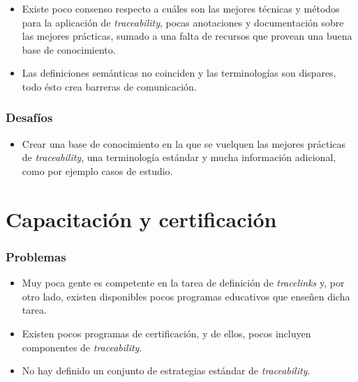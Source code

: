 \documentclass[a4paper,12pt,oneside,spanish]{book}
\begin{document}
\begin{itemize}[label={$\times$}]

\item Existe poco consenso respecto a cuáles son las mejores técnicas y métodos para la aplicación de \textit{traceability}, pocas anotaciones y documentación sobre las mejores prácticas, sumado a una falta de recursos que provean una buena base de conocimiento.

\item Las definiciones semánticas no coinciden y las terminologías son dispares, todo ésto crea barreras de comunicación.

\end{itemize}

\subsubsection{Desafíos}

\begin{itemize}[label={\checkmark}]

\item Crear una base de conocimiento en la que se vuelquen las mejores prácticas de \textit{traceability}, una terminología estándar y mucha información adicional, como por ejemplo casos de estudio.

\end{itemize}

\section{Capacitación y certificación}

\subsubsection{Problemas}

\begin{itemize}[label={$\times$}]
\item Muy poca gente es competente en la tarea de definición de \textit{tracelinks} y, por otro lado, existen disponibles pocos programas educativos que enseñen dicha tarea.

\item Existen pocos programas de certificación, y de ellos, pocos incluyen componentes de \textit{traceability}.

\item No hay definido un conjunto de estrategias estándar de \textit{traceability}.

\end{itemize}
\end{document}
